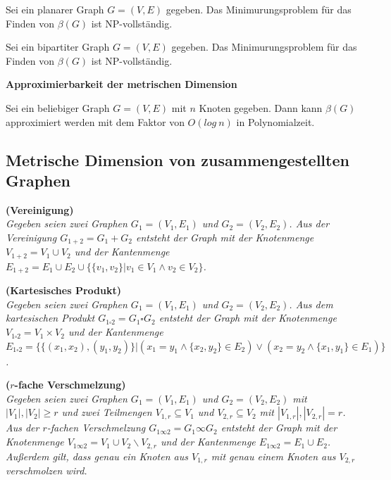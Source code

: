 \begin{lem}
Sei ein planarer Graph $G=(V,E)$ gegeben. Das Minimurungsproblem für das Finden von $\beta(G)$ ist NP-vollständig.\cite{onthecomplexity}
\end{lem}

\begin{lem}
Sei ein bipartiter Graph $G=(V,E)$ gegeben. Das Minimurungsproblem für das Finden von $\beta(G)$ ist NP-vollständig.\cite{anefficientrepresentationofbenesnetworksanditsapplications}
\end{lem}

\textbf{Approximierbarkeit der metrischen Dimension}
\begin{lem}
Sei ein beliebiger Graph $G=(V,E)$ mit $n$ Knoten gegeben. Dann kann $\beta(G)$ approximiert werden mit dem Faktor von $O(log\:n)$ in Polynomialzeit.\cite{landmarks}
\end{lem}
\subsection{Metrische Dimension von zusammengestellten Graphen}
\begin{defi}{\textbf{(Vereinigung)}}\\
\emph{Gegeben seien zwei Graphen $G_1=(V_1,E_1)$ und $G_2=(V_2,E_2)$. Aus der Vereinigung $G_{1+2}=G_1+G_2$ entsteht der Graph mit der Knotenmenge $V_{1+2}=V_1 \cup V_2$ und der Kantenmenge $E_{1+2}= E_1 \cup E_2 \cup \{\{v_1,v_2\}| v_1 \in V_1 \wedge v_2 \in V_2\}$.} 
\end{defi}

\begin{defi}{\textbf{(Kartesisches Produkt)}}\\
\emph{Gegeben seien zwei Graphen $G_1=(V_1,E_1)$ und $G_2=(V_2,E_2)$. Aus dem kartesischen Produkt $G_{1\square 2}=G_1 \square G_2$ entsteht der Graph mit der Knotenmenge $V_{1 \square 2}=V_1 \times V_2$ und der Kantenmenge $E_{1\square 2}= \{\{(x_1,x_2),(y_1,y_2)\}| (x_1=y_1 \wedge \{x_2,y_2\} \in E_2)\vee (x_2=y_2 \wedge \{x_1,y_1\} \in E_1)\}$.} 
\end{defi}

\begin{defi}{\textbf{($r$-fache Verschmelzung)}}\\
\emph{Gegeben seien zwei Graphen $G_1=(V_1,E_1)$ und $G_2=(V_2,E_2)$ mit $|V_1|, |V_2| \geq r$ und zwei Teilmengen $V_{1,r} \subseteq V_1$ und $V_{2,r} \subseteq V_2$ mit $|V_{1,r}|, |V_{2,r}| = r$. Aus der $r$-fachen Verschmelzung $G_{1 \infty 2}=G_1 \infty G_2$ entsteht der Graph mit der Knotenmenge $V_{1 \infty 2}=V_1 \cup V_2\backslash V_{2,r}$ und der Kantenmenge $E_{1\infty 2}= E_1 \cup E_2$. Außerdem gilt, dass genau ein Knoten aus $V_{1,r}$ mit genau einem Knoten aus $V_{2,r}$ verschmolzen wird.} 
\end{defi}

